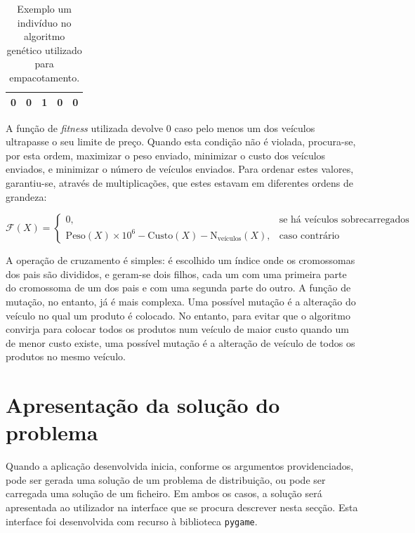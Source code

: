 \documentclass[12pt, a4paper, titlepage]{article}
\begin{document}
\begin{table}[H]
    \begin{center}
        \begin{tabular}{|c|c|c|c|c|}
            \hline 0 & 0 & 1 & 0 & 0 \\ \hline
        \end{tabular}

        \caption{Exemplo um indivíduo no algoritmo genético utilizado para empacotamento.}
    \end{center}
\end{table}

A função de \emph{fitness} utilizada devolve 0 caso pelo menos um dos veículos ultrapasse o seu
limite de preço. Quando esta condição não é violada, procura-se, por esta ordem, maximizar o
peso enviado, minimizar o custo dos veículos enviados, e minimizar o número de veículos enviados.
Para ordenar estes valores, garantiu-se, através de multiplicações, que estes estavam em diferentes
ordens de grandeza:

$$
\mathcal{F}(X) =
\begin{cases}
    0
        ,& \text{se há veículos sobrecarregados} \\
    \text{Peso}(X) \times 10^6 - \text{Custo}(X) - \text{N}_\text{veículos}(X)
        ,& \text{caso contrário}
\end{cases}
$$

A operação de cruzamento é simples: é escolhido um índice onde os cromossomas dos pais são
divididos, e geram-se dois filhos, cada um com uma primeira parte do cromossoma de um dos pais e com
uma segunda parte do outro. A função de mutação, no entanto, já é mais complexa. Uma possível
mutação é a alteração do veículo no qual um produto é colocado. No entanto, para evitar que o
algoritmo convirja para colocar todos os produtos num veículo de maior custo quando um de menor
custo existe, uma possível mutação é a alteração de veículo de todos os produtos no mesmo veículo.

\section{Apresentação da solução do problema}

Quando a aplicação desenvolvida inicia, conforme os argumentos providenciados, pode ser gerada uma
solução de um problema de distribuição, ou pode ser carregada uma solução de um ficheiro. Em ambos
os casos, a solução será apresentada ao utilizador na interface que se procura descrever nesta
secção. Esta interface foi desenvolvida com recurso à biblioteca \texttt{pygame}.
\end{document}
